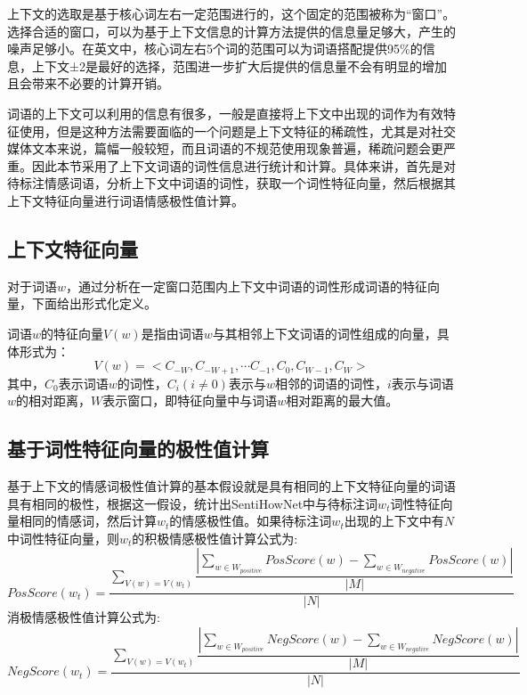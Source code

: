 上下文的选取是基于核心词左右一定范围进行的，这个固定的范围被称为“窗口”。选择合适的窗口，可以为基于上下文信息的计算方法提供的信息量足够大，产生的噪声足够小。在英文中，核心词左右5个词的范围可以为词语搭配提供95\%的信息，上下文±2是最好的选择，范围进一步扩大后提供的信息量不会有明显的增加且会带来不必要的计算开销。

词语的上下文可以利用的信息有很多，一般是直接将上下文中出现的词作为有效特征使用，但是这种方法需要面临的一个问题是上下文特征的稀疏性，尤其是对社交媒体文本来说，篇幅一般较短，而且词语的不规范使用现象普遍，稀疏问题会更严重。因此本节采用了上下文词语的词性信息进行统计和计算。具体来讲，首先是对待标注情感词语，分析上下文中词语的词性，获取一个词性特征向量，然后根据其上下文特征向量进行词语情感极性值计算。

\subsection{上下文特征向量}
对于词语$w$，通过分析在一定窗口范围内上下文中词语的词性形成词语的特征向量，下面给出形式化定义。
\begin{definition}
词语$w$的特征向量$V(w)$是指由词语$w$与其相邻上下文词语的词性组成的向量，具体形式为：
$$V(w)=<C_{-W},C_{-W+1},\cdots C_{-1},C_0,C_{W-1},C_W>$$
其中，$C_0$表示词语$w$的词性，$C_i(i\neq 0)$表示与$w$相邻的词语的词性，$i$表示与词语$w$的相对距离，$W$表示窗口，即特征向量中与词语$w$相对距离的最大值。
\end{definition}

\subsection{基于词性特征向量的极性值计算}
基于上下文的情感词极性值计算的基本假设就是具有相同的上下文特征向量的词语具有相同的极性，根据这一假设，统计出SentiHowNet中与待标注词$ w_t$词性特征向量相同的情感词，然后计算$ w_t $的情感极性值。如果待标注词$ w_t$出现的上下文中有$ N $中词性特征向量，则$ w_t$的积极情感极性值计算公式为:
\begin{equation}
\label{eq3-2-1}
PosScore(w_t)=\dfrac{\sum_{V(w)=V(w_t)}\dfrac{|\sum_{w \in W_{positive}}PosScore(w)-\sum_{w \in W_{negative}}PosScore(w)|}{|M|}}{|N|}
\end{equation}
消极情感极性值计算公式为:
\begin{equation}
\label{eq3-2-1}
NegScore(w_t)=\dfrac{\sum_{V(w)=V(w_t)}\dfrac{|\sum_{w \in W_{positive}}NegScore(w)-\sum_{w \in W_{negative}}NegScore(w)|}{|M|}}{|N|}
\end{equation}


